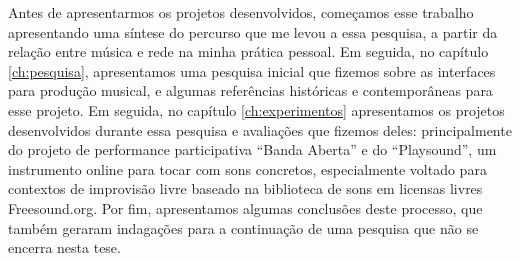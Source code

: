 {Antes de apresentarmos os projetos desenvolvidos, começamos esse trabalho apresentando uma síntese do percurso que me levou a essa pesquisa, a partir da relação entre música e rede na minha prática pessoal. Em seguida, no capítulo \ref{ch:pesquisa}, apresentamos uma pesquisa inicial que fizemos sobre as interfaces para produção musical, e algumas referências históricas e contemporâneas para esse projeto. Em seguida, no capítulo \ref{ch:experimentos} apresentamos os projetos desenvolvidos durante essa pesquisa e avaliações que fizemos deles: principalmente do projeto de performance participativa ``Banda Aberta'' e do ``Playsound'', um instrumento online para tocar com sons concretos, especialmente voltado para contextos de improvisão livre baseado na biblioteca de sons em licensas livres Freesound.org. Por fim, apresentamos algumas conclusões deste processo, que também geraram indagações para a continuação de uma pesquisa que não se encerra nesta tese. 
















}
